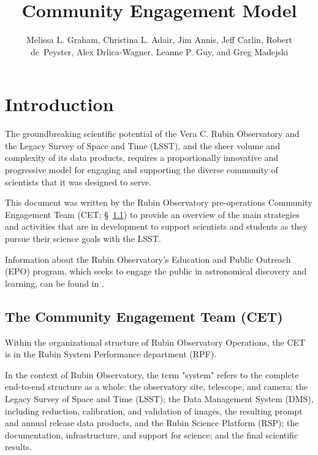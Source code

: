 \documentclass[DM,lsstdraft,toc]{lsstdoc}
\title{Community Engagement Model}
\author{%
Melissa L. Graham, Christina L. Adair, Jim Annis, Jeff Carlin, Robert de~Peyster, Alex Drlica-Wagner, Leanne P. Guy, and Greg Madejski
}
\date{\vcsDate}
\begin{document}
\maketitle



\section{Introduction}\label{sec:intro}

The groundbreaking scientific potential of the Vera C. Rubin Observatory and the Legacy Survey of Space and Time (LSST), and the sheer volume and complexity of its data products, requires a proportionally innovative and progressive model for engaging and supporting the diverse community of scientists that it was designed to serve. 

This document was written by the Rubin Observatory pre-operations Community Engagement Team (CET; \S~\ref{sec:intro_org}) to provide an overview of the main strategies and activities that are in development to support scientists and students as they pursue their science goals with the LSST. 

Information about the Rubin Observatory's Education and Public Outreach (EPO) program, which seeks to engage the public in astronomical discovery and learning, can be found in .


\subsection{The Community Engagement Team (CET)}\label{sec:intro_org}

Within the organizational structure of Rubin Observatory Operations, the CET is in the Rubin System Performance department (RPF).

In the context of Rubin Observatory, the term "system" refers to the complete end-to-end structure as a whole: the observatory site, telescope, and camera; the Legacy Survey of Space and Time (LSST); the Data Management System (DMS), including reduction, calibration, and validation of images, the resulting prompt and annual release data products, and the Rubin Science Platform (RSP); the documentation, infrastructure, and support for science; and the final scientific results. 
\end{document}
